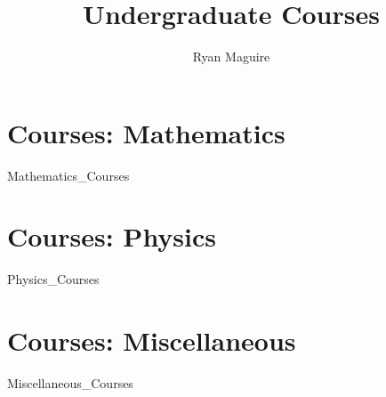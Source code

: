 \documentclass[crop=false,class=book,oneside]{standalone}
\begin{document}
    \newif\ifcourses
    \ifstandalone
        \title{Undergraduate Courses}
        \author{Ryan Maguire}
        \date{\vspace{-5ex}}
        \maketitle
        \tableofcontents
        \listoffigures
        \listoftables
        \clearpage
    \fi
    \part{Courses: Mathematics}
        {Mathematics_Courses}
    \part{Courses: Physics}
        {Physics_Courses}
    \part{Courses: Miscellaneous}
        {Miscellaneous_Courses}
\end{document}
